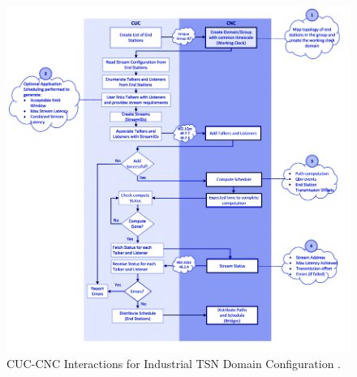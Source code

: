 \begin{itemize}
\begin{figure}
\centering
\includegraphics[scale=0.38]{images/CUC-CNC Interactions for Industrial TSN Domain Configuration.png} 
\caption{CUC-CNC Interactions for Industrial TSN Domain Configuration \cite{Eri_Gar_Theo_Oper_TSN2017study}.}
\label{fig:CUC-CNC_Interactions_for_Industrial_TSN_Domain_Configuration}
 \end{figure}



\end{itemize}

